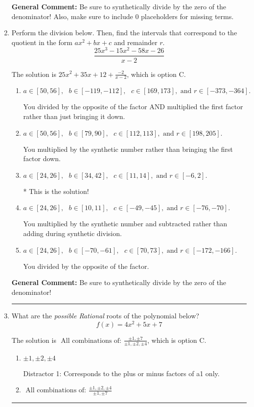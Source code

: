 \documentclass{extbook}[14pt]
\newcommand{\litem}[1]{\item #1

\rule{\textwidth}{0.4pt}}
\begin{document}
\begin{enumerate}
{\textbf{General Comment:} Be sure to synthetically divide by the zero of the denominator! Also, make sure to include 0 placeholders for missing terms.
}
\litem{
Perform the division below. Then, find the intervals that correspond to the quotient in the form $ax^2+bx+c$ and remainder $r$.
\[ \frac{25x^{3} -15 x^{2} -58 x -26}{x -2} \]

The solution is \( 25x^{2} +35 x + 12 + \frac{-2}{x -2} \), which is option C.\begin{enumerate}[label=\Alph*.]
\item \( a \in [50, 56], \text{   } b \in [-119, -112], \text{   } c \in [169, 173], \text{   and   } r \in [-373, -364]. \)

 You divided by the opposite of the factor AND multiplied the first factor rather than just bringing it down.
\item \( a \in [50, 56], \text{   } b \in [79, 90], \text{   } c \in [112, 113], \text{   and   } r \in [198, 205]. \)

 You multiplied by the synthetic number rather than bringing the first factor down.
\item \( a \in [24, 26], \text{   } b \in [34, 42], \text{   } c \in [11, 14], \text{   and   } r \in [-6, 2]. \)

* This is the solution!
\item \( a \in [24, 26], \text{   } b \in [10, 11], \text{   } c \in [-49, -45], \text{   and   } r \in [-76, -70]. \)

 You multiplied by the synthetic number and subtracted rather than adding during synthetic division.
\item \( a \in [24, 26], \text{   } b \in [-70, -61], \text{   } c \in [70, 73], \text{   and   } r \in [-172, -166]. \)

 You divided by the opposite of the factor.
\end{enumerate}

\textbf{General Comment:} Be sure to synthetically divide by the zero of the denominator!
}
\litem{
What are the \textit{possible Rational} roots of the polynomial below?
\[ f(x) = 4x^{2} +5 x + 7 \]

The solution is \( \text{ All combinations of: }\frac{\pm 1,\pm 7}{\pm 1,\pm 2,\pm 4} \), which is option C.\begin{enumerate}[label=\Alph*.]
\item \( \pm 1,\pm 2,\pm 4 \)

 Distractor 1: Corresponds to the plus or minus factors of a1 only.
\item \( \text{ All combinations of: }\frac{\pm 1,\pm 2,\pm 4}{\pm 1,\pm 7} \)


\end{enumerate}}
\end{enumerate}
\end{document}
